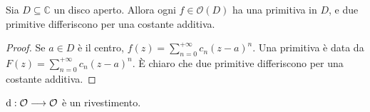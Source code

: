 \begin{lm} \label{primitiva}
  Sia $D \subseteq \mathbb{C}$ un disco aperto. Allora ogni $f \in \mathcal{O}(D)$ ha una primitiva in $D$, e due primitive differiscono per una costante additiva.
\end{lm}

\begin{proof}
  Se $a \in D$ è il centro, $\displaystyle f(z)=\sum_{n=0}^{+\infty} c_n(z-a)^n$. Una primitiva è data da $\displaystyle F(z)=\sum_{n=0}^{+\infty} c_n(z-a)^n$. È chiaro che due primitive differiscono per una costante additiva.
\end{proof}

\begin{prop}
  $\mathop{}\!\mathrm{d}:\mathcal{O} \longrightarrow \mathcal{O}$ è un rivestimento.
\end{prop}

